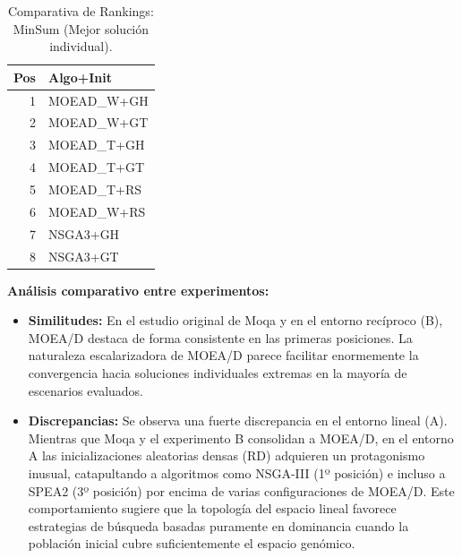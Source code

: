 \documentclass[a4paper,10pt]{article}
\begin{document}
\begin{table}[H]
\begin{minipage}[t]{0.32\textwidth}
        \begin{tabular}{rl}
            Pos & Algo+Init \\ \midrule
            1 & MOEAD\_W+GH \\
            2 & MOEAD\_W+GT \\
            3 & MOEAD\_T+GH \\
            4 & MOEAD\_T+GT \\
            5 & MOEAD\_T+RS \\
            6 & MOEAD\_W+RS \\
            7 & NSGA3+GH \\
            8 & NSGA3+GT \\
            \bottomrule
        \end{tabular}
    \end{minipage}
    \caption{Comparativa de Rankings: MinSum (Mejor solución individual).}
\end{table}

\textbf{Análisis comparativo entre experimentos:}
\begin{itemize}
    \item \textbf{Similitudes:} En el estudio original de Moqa y en el entorno recíproco (B), MOEA/D destaca de forma consistente en las primeras posiciones. La naturaleza escalarizadora de MOEA/D parece facilitar enormemente la convergencia hacia soluciones individuales extremas en la mayoría de escenarios evaluados.
    \item \textbf{Discrepancias:} Se observa una fuerte discrepancia en el entorno lineal (A). Mientras que Moqa y el experimento B consolidan a MOEA/D, en el entorno A las inicializaciones aleatorias densas (RD) adquieren un protagonismo inusual, catapultando a algoritmos como NSGA-III (1º posición) e incluso a SPEA2 (3º posición) por encima de varias configuraciones de MOEA/D. Este comportamiento sugiere que la topología del espacio lineal favorece estrategias de búsqueda basadas puramente en dominancia cuando la población inicial cubre suficientemente el espacio genómico.
\end{itemize}
\end{document}
